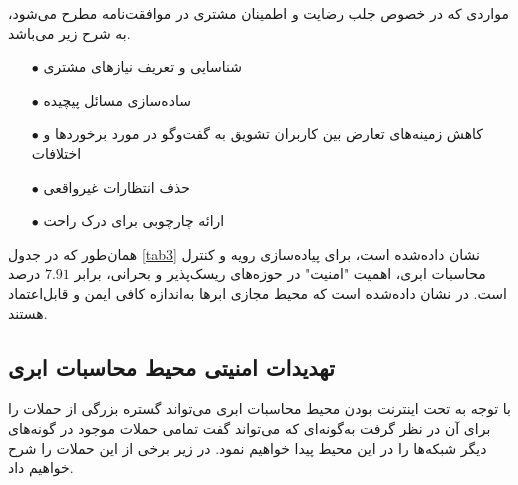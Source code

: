 \documentclass[a4paper,oneside,12pt]{report}
\begin{document}
مواردی که در خصوص جلب رضایت و اطمینان مشتری در موافقت‌نامه مطرح می‌شود، به شرح زیر می‌باشد.
\begin{itemize}
\item[$\bullet$]
شناسایی و تعریف نیازهای مشتری
\item[$\bullet$]
ساده‌سازی مسائل پیچیده
\item[$\bullet$]
کاهش زمینه‌های تعارض بین کاربران تشویق به گفت‌وگو در مورد برخوردها و اختلافات
\item[$\bullet$]
حذف انتظارات غیرواقعی
\item[$\bullet$]
ارائه چارچوبی برای درک راحت
\end{itemize}	 
همان‌طور که در جدول 
\ref{tab3} 
نشان داده‌شده است، برای پیاده‌سازی رویه و کنترل محاسبات ابری، اهمیت "امنیت" در حوزه‌های ریسک‌پذیر و بحرانی، برابر 
$7.91$ 
درصد است. در
\cite{14} 
نشان داده‌شده است که محیط مجازی ابرها به‌اندازه کافی ایمن و قابل‌اعتماد هستند.
\begin{table}[h!]
\caption{حوزه‌های ریسک‌پذیر و بحرانی در مجازی‌سازی و محاسبات ابری}
\label{tab1}
\begin{center}
\renewcommand{\arraystretch}{2}
\end{center}
\end{table}
\subsection{تهدیدات امنیتی محیط محاسبات ابری}
با توجه به تحت اینترنت بودن محیط محاسبات ابری می‌تواند گستره بزرگی از حملات را برای آن در نظر گرفت به‌گونه‌ای که می‌تواند گفت تمامی حملات موجود در گونه‌های دیگر شبکه‌ها را در این محیط پیدا خواهیم نمود. در زیر برخی از این حملات را شرح خواهیم داد.
\end{document}

